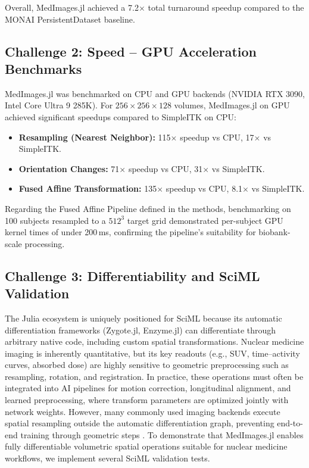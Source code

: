 \documentclass[10pt,letterpaper]{article}
\begin{document}
Overall, MedImages.jl achieved a 7.2$\times$ total turnaround speedup compared to the MONAI PersistentDataset baseline.

\subsection*{Challenge 2: Speed -- GPU Acceleration Benchmarks}
MedImages.jl was benchmarked on CPU and GPU backends (NVIDIA RTX 3090, Intel Core Ultra 9 285K). For $256 \times 256 \times 128$ volumes, MedImages.jl on GPU achieved significant speedups compared to SimpleITK on CPU:
\begin{itemize}
    \item \textbf{Resampling (Nearest Neighbor):} 115$\times$ speedup vs CPU, 17$\times$ vs SimpleITK.
    \item \textbf{Orientation Changes:} 71$\times$ speedup vs CPU, 31$\times$ vs SimpleITK.
    \item \textbf{Fused Affine Transformation:} 135$\times$ speedup vs CPU, 8.1$\times$ vs SimpleITK.
\end{itemize}

Regarding the Fused Affine Pipeline defined in the methods, benchmarking on 100 subjects resampled to a $512^3$ target grid demonstrated per-subject GPU kernel times of under 200\,ms, confirming the pipeline's suitability for biobank-scale processing.

\subsection*{Challenge 3: Differentiability and SciML Validation}
The Julia ecosystem is uniquely positioned for SciML because its automatic differentiation frameworks (Zygote.jl, Enzyme.jl) can differentiate through arbitrary native code, including custom spatial transformations. Nuclear medicine imaging is inherently quantitative, but its key readouts (e.g., SUV, time–activity curves, absorbed dose) are highly sensitive to geometric preprocessing such as resampling, rotation, and registration. In practice, these operations must often be integrated into AI pipelines for motion correction, longitudinal alignment, and learned preprocessing, where transform parameters are optimized jointly with network weights. However, many commonly used imaging backends execute spatial resampling outside the automatic differentiation graph, preventing end-to-end training through geometric steps \cite{Berman_2024}. To demonstrate that MedImages.jl enables fully differentiable volumetric spatial operations suitable for nuclear medicine workflows, we implement several SciML validation tests.
\end{document}
